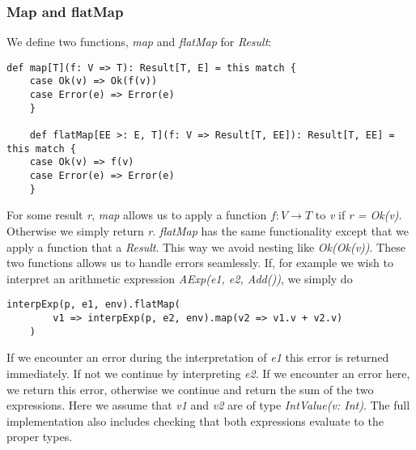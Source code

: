 \subsubsection{Map and flatMap}

We define two functions, \textsl{map} and \textsl{flatMap} for \textsl{Result}:

\begin{lstlisting}[style=complex]
	def map[T](f: V => T): Result[T, E] = this match {
	case Ok(v) => Ok(f(v))
	case Error(e) => Error(e)
	}
	
	def flatMap[EE >: E, T](f: V => Result[T, EE]): Result[T, EE] = this match {
	case Ok(v) => f(v)
	case Error(e) => Error(e)
	}
\end{lstlisting}
For some result \textsl{r}, \textsl{map} allows us to apply a function $f: V \rightarrow T$ to \textsl{v} if \textsl{r = Ok(v)}. Otherwise we simply return \textsl{r}. \textsl{flatMap} has the same functionality except that we apply a function that a \textsl{Result}. This way we avoid nesting like \textsl{Ok(Ok(v))}. These two functions allows us to handle errors seamlessly. If, for example we wish to interpret an arithmetic expression \textsl{AExp(e1, e2, Add())}, we simply do 

\begin{lstlisting}[style=simple]
	interpExp(p, e1, env).flatMap(
		v1 => interpExp(p, e2, env).map(v2 => v1.v + v2.v)
	)
\end{lstlisting}
If we encounter an error during the interpretation of \textsl{e1} this error is returned immediately. If not we continue by interpreting \textsl{e2}. If we encounter an error here, we return this error, otherwise we continue and return the sum of the two expressions. Here we assume that \textsl{v1} and \textsl{v2} are of type \textsl{IntValue(v: Int)}. The full implementation also includes checking that both expressions evaluate to the proper types.


